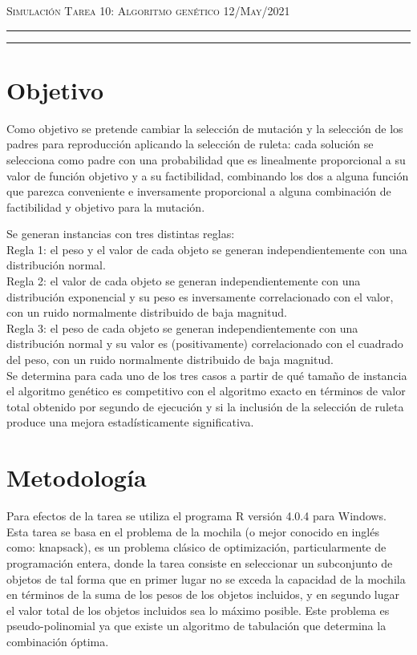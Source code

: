 \documentclass[12pt]{amsart}
\begin{document}
\pagestyle{empty}



\thispagestyle{empty}

{\scshape Simulación} \hfill {\scshape \Large Tarea 10: Algoritmo genético} \hfill  {\scshape 12/May/2021}
\author{C. María Montemayor Palos}
\maketitle
\hrule
\hrule
\bigskip
\section{Objetivo}
Como objetivo se pretende cambiar la selección de mutación y la selección de los padres para reproducción aplicando la selección de ruleta: cada solución se selecciona como padre con una probabilidad que es linealmente proporcional a su valor de función objetivo y a su factibilidad, combinando los dos a alguna función que parezca conveniente e inversamente proporcional a alguna combinación de factibilidad y objetivo para la mutación.

Se generan instancias con tres distintas reglas:\\
Regla 1: el peso y el valor de cada objeto se generan independientemente con una distribución normal.\\
Regla 2: el valor de cada objeto se generan independientemente con una distribución exponencial y su peso es inversamente correlacionado con el valor, con un ruido normalmente distribuido de baja magnitud.\\
Regla 3: el peso de cada objeto se generan independientemente con una distribución normal y su valor es (positivamente) correlacionado con el cuadrado del peso, con un ruido normalmente distribuido de baja magnitud.\\
Se determina para cada uno de los tres casos a partir de qué tamaño de instancia el algoritmo genético es competitivo con el algoritmo exacto en términos de valor total obtenido por segundo de ejecución y si la inclusión de la selección de ruleta produce una mejora estadísticamente significativa.

\section{Metodología}
Para efectos de la tarea \cite{dra} se utiliza el programa R versión 4.0.4 \cite{R} para Windows. Esta tarea se basa en el problema de la mochila (o mejor conocido en inglés como: knapsack), es un problema clásico de optimización, particularmente de programación entera, donde la tarea consiste en seleccionar un subconjunto de objetos de tal forma que en primer lugar no se exceda la capacidad de la mochila en términos de la suma de los pesos de los objetos incluidos, y en segundo lugar el valor total de los objetos incluidos sea lo máximo posible. Este problema es pseudo-polinomial ya que existe un algoritmo de tabulación que determina la combinación óptima.
\end{document}

